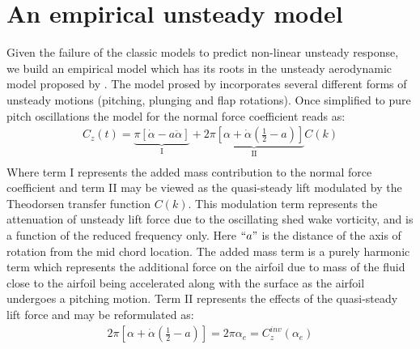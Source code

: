 \section{An empirical unsteady model}
Given the failure of the classic models to predict non-linear unsteady response, we build an empirical model which has its roots in the unsteady aerodynamic model proposed by \cite{theodorsen35}. The model prosed by \cite{theodorsen35} incorporates several different forms of unsteady motions (pitching, plunging and flap rotations). Once simplified to pure pitch oscillations the model for the normal force coefficient reads as:
\begin{align}
	C_{z}(t) = \underbrace{\pi [\dot{\alpha} - a\ddot{\alpha}]}_{\text{I}} + \underbrace{2\pi [\alpha + \dot{\alpha}(\frac{1}{2} - a)]}_{\text{II}}C(k) \nonumber \\
\end{align}
Where term I represents the added mass contribution to the normal force coefficient and term II may be viewed as the quasi-steady lift modulated by the Theodorsen transfer function $C(k)$. This modulation term represents the attenuation of unsteady lift force due to the oscillating shed wake vorticity, and is a function of the reduced frequency only. Here $``a"$ is the distance of the axis of rotation from the mid chord location. The added mass term is a purely harmonic term which represents the additional force on the airfoil due to mass of the fluid close to the airfoil being accelerated along with the surface as the airfoil undergoes a pitching motion. Term II represents the effects of the quasi-steady lift force and may be reformulated as:
\begin{align}
	2\pi [\alpha + \dot{\alpha}(\frac{1}{2} - a)] = 2\pi\alpha_{e} = C^{inv}_{z}(\alpha_{e})
\end{align}

